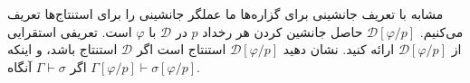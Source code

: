 مشابه با تعریف جانشینی برای گزاره‌ها ما عملگر جانشینی را برای استنتاج‌ها تعریف می‌کنیم.
$\mathcal{D}[\varphi/p]$
حاصل جانشین کردن هر رخداد $p$ در $\mathcal{\mathcal{D}}$ با $\varphi$ است.
تعریفی استقرایی از
$\mathcal{D}[\varphi/p]$
ارائه کنید. نشان دهید
$\mathcal{D}[\varphi/p]$
استنتاج است اگر
$\mathcal{D}$
استنتاج باشد، و اینکه اگر
$\Gamma\vdash\sigma$
آنگاه
$\Gamma[\varphi/p]\vdash\sigma[\varphi/p]$.